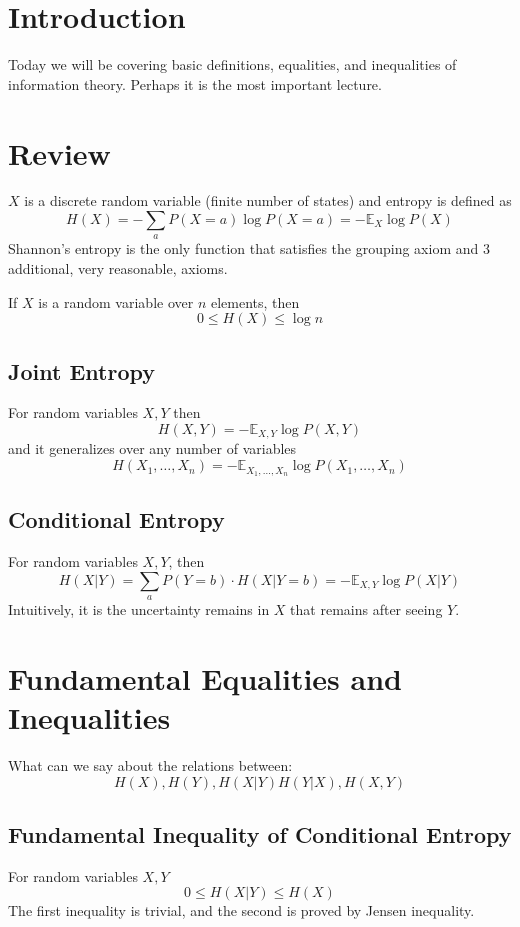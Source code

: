 \documentclass{article}
\begin{document}
\section{Introduction}

Today we will be covering basic definitions, equalities, and inequalities of information theory. Perhaps it is the most important lecture.

\section{Review}

$X$ is a discrete random variable (finite number of states) and entropy is defined as 
\[
H(X) = -\sum_a P(X=a)\log P(X=a)=-\mathbb{E}_X \log P(X)
\]
Shannon's entropy is the only function that satisfies the grouping axiom and 3 additional, very reasonable, axioms.

If $X$ is a random variable over $n$ elements, then 
\[
0\leq H(X)\leq \log n 
\]

\subsection{Joint Entropy}

For random variables $X,Y$ then 
\[
H(X,Y) = -\mathbb{E}_{X,Y} \log P(X,Y)
\]
and it generalizes over any number of variables
\[
H(X_1,\ldots,X_n) = -\mathbb{E}_{X_1,\ldots,X_n} \log P(X_1,\ldots,X_n)
\]

\subsection{Conditional Entropy}

For random variables $X,Y$, then 
\[
H(X|Y) = \sum_a P(Y=b)\cdot H(X|Y=b)=- \mathbb{E}_{X,Y} \log P(X|Y)
\]
Intuitively, it is the uncertainty remains in $X$ that remains after seeing $Y$.

\section{Fundamental Equalities and Inequalities}

What can we say about the relations between:
\[
H(X),H(Y),H(X|Y)H(Y|X),H(X,Y)
\]
\subsection{Fundamental Inequality of Conditional Entropy}

For random variables $X,Y$
\[
0\leq H(X|Y)\leq H(X)
\]
The first inequality is trivial, and the second is proved by Jensen inequality.
\end{document}
